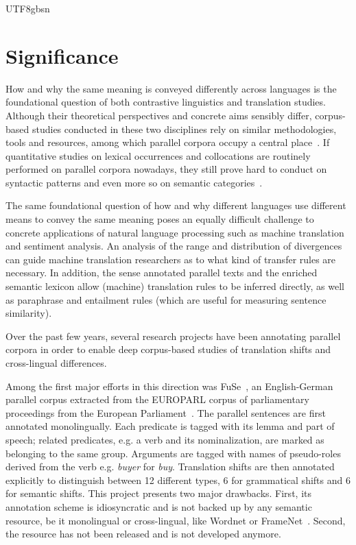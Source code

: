 \documentclass[12pt]{book} %
\begin{document}
\begin{CJK}{UTF8}{gbsn}
\section{Significance}
How and why the same meaning is conveyed differently across languages
is the foundational question of both contrastive linguistics and
translation studies.
Although their theoretical perspectives and concrete aims sensibly
differ, corpus-based studies conducted in these two disciplines rely
on similar methodologies, tools and resources, among which parallel
corpora occupy a central place~\citep{granger2003corpus}.
If quantitative studies on lexical occurrences and collocations are
routinely performed on parallel corpora nowadays, they still prove
hard to conduct on syntactic patterns and even more so on semantic
categories~\citep{ebeling1998contrastive, granger2003corpus}.

The same foundational question of how and why different languages use
different means to convey the same meaning poses an equally difficult
challenge to concrete applications of natural language processing such
as machine translation and sentiment analysis.
An analysis of the range and distribution of divergences can guide
machine translation researchers as to what kind of transfer rules are
necessary.  In addition, the sense annotated parallel texts and the
enriched semantic lexicon allow (machine) translation rules to be
inferred directly, as well as paraphrase and entailment rules
(which are useful for measuring sentence similarity).

Over the past few years, several research projects have been
annotating parallel corpora in order to enable deep corpus-based
studies of translation shifts and cross-lingual differences.

Among the first major efforts in this direction was
FuSe~\citep{cyrus2006building}, an English-German parallel corpus
extracted from the EUROPARL corpus of parliamentary proceedings from
the European Parliament~\citep{Koehn:2005}.
The parallel sentences are first annotated monolingually.
Each predicate is tagged with its lemma and part of speech;
related predicates, e.g. a verb and its nominalization, are marked as
belonging to the same group.
Arguments are tagged with names of pseudo-roles derived from the verb
e.g. \textit{buyer} for \textit{buy}.
Translation shifts are then annotated explicitly to distinguish
between 12 different types, 6 for grammatical shifts and 6 for
semantic shifts.
This project presents two major drawbacks.
First, its annotation scheme is idiosyncratic and is not backed up by
any semantic resource, be it monolingual or cross-lingual, like
Wordnet or FrameNet~\citep{baker1998berkeley}.
Second, the resource has not been released and is not developed
anymore.


\end{CJK}
\end{document}
